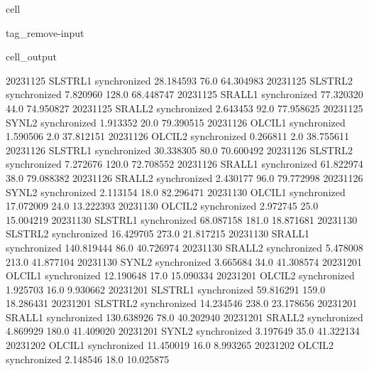 \documentclass[letterpaper,10pt,english]{jupyterBook}
\begin{document}
\begin{sphinxuseclass}{cell}
\begin{sphinxuseclass}{tag_remove-input}
\begin{sphinxVerbatimOutput}
\begin{sphinxuseclass}{cell_output}
\begin{sphinxVerbatim}[commandchars=\\\{\}]
2023\PYGZhy{}11\PYGZhy{}25     SLSTR\PYGZus{}L1  synchronized   28.184593    76.0   64.304983
2023\PYGZhy{}11\PYGZhy{}25     SLSTR\PYGZus{}L2  synchronized    7.820960   128.0   68.448747
2023\PYGZhy{}11\PYGZhy{}25      SRAL\PYGZus{}L1  synchronized   77.320320    44.0   74.950827
2023\PYGZhy{}11\PYGZhy{}25      SRAL\PYGZus{}L2  synchronized    2.643453    92.0   77.958625
2023\PYGZhy{}11\PYGZhy{}25       SYN\PYGZus{}L2  synchronized    1.913352    20.0   79.390515
2023\PYGZhy{}11\PYGZhy{}26      OLCI\PYGZus{}L1  synchronized    1.590506     2.0   37.812151
2023\PYGZhy{}11\PYGZhy{}26      OLCI\PYGZus{}L2  synchronized    0.266811     2.0   38.755611
2023\PYGZhy{}11\PYGZhy{}26     SLSTR\PYGZus{}L1  synchronized   30.338305    80.0   70.600492
2023\PYGZhy{}11\PYGZhy{}26     SLSTR\PYGZus{}L2  synchronized    7.272676   120.0   72.708552
2023\PYGZhy{}11\PYGZhy{}26      SRAL\PYGZus{}L1  synchronized   61.822974    38.0   79.088382
2023\PYGZhy{}11\PYGZhy{}26      SRAL\PYGZus{}L2  synchronized    2.430177    96.0   79.772998
2023\PYGZhy{}11\PYGZhy{}26       SYN\PYGZus{}L2  synchronized    2.113154    18.0   82.296471
2023\PYGZhy{}11\PYGZhy{}30      OLCI\PYGZus{}L1  synchronized   17.072009    24.0   13.222393
2023\PYGZhy{}11\PYGZhy{}30      OLCI\PYGZus{}L2  synchronized    2.972745    25.0   15.004219
2023\PYGZhy{}11\PYGZhy{}30     SLSTR\PYGZus{}L1  synchronized   68.087158   181.0   18.871681
2023\PYGZhy{}11\PYGZhy{}30     SLSTR\PYGZus{}L2  synchronized   16.429705   273.0   21.817215
2023\PYGZhy{}11\PYGZhy{}30      SRAL\PYGZus{}L1  synchronized  140.819444    86.0   40.726974
2023\PYGZhy{}11\PYGZhy{}30      SRAL\PYGZus{}L2  synchronized    5.478008   213.0   41.877104
2023\PYGZhy{}11\PYGZhy{}30       SYN\PYGZus{}L2  synchronized    3.665684    34.0   41.308574
2023\PYGZhy{}12\PYGZhy{}01      OLCI\PYGZus{}L1  synchronized   12.190648    17.0   15.090334
2023\PYGZhy{}12\PYGZhy{}01      OLCI\PYGZus{}L2  synchronized    1.925703    16.0    9.930662
2023\PYGZhy{}12\PYGZhy{}01     SLSTR\PYGZus{}L1  synchronized   59.816291   159.0   18.286431
2023\PYGZhy{}12\PYGZhy{}01     SLSTR\PYGZus{}L2  synchronized   14.234546   238.0   23.178656
2023\PYGZhy{}12\PYGZhy{}01      SRAL\PYGZus{}L1  synchronized  130.638926    78.0   40.202940
2023\PYGZhy{}12\PYGZhy{}01      SRAL\PYGZus{}L2  synchronized    4.869929   180.0   41.409020
2023\PYGZhy{}12\PYGZhy{}01       SYN\PYGZus{}L2  synchronized    3.197649    35.0   41.322134
2023\PYGZhy{}12\PYGZhy{}02      OLCI\PYGZus{}L1  synchronized   11.450019    16.0    8.993265
2023\PYGZhy{}12\PYGZhy{}02      OLCI\PYGZus{}L2  synchronized    2.148546    18.0   10.025875

\end{sphinxVerbatim}
\end{sphinxuseclass}
\end{sphinxVerbatimOutput}
\end{sphinxuseclass}
\end{sphinxuseclass}
\end{document}
